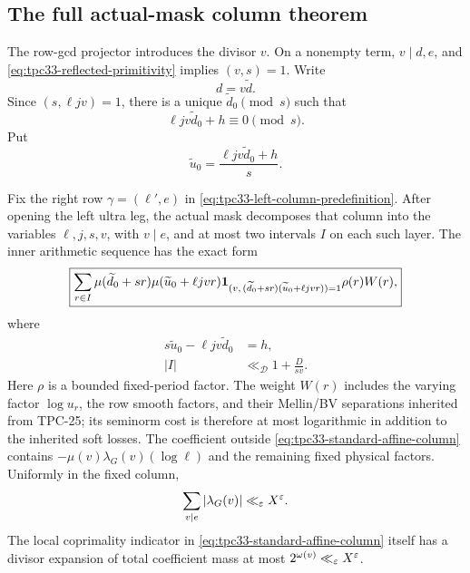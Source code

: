 \subsection{The full actual-mask column theorem}

The row-gcd projector introduces the divisor \(v\).  On a nonempty term,
\(v\mid d,e\), and \eqref{eq:tpc33-reflected-primitivity} implies
\((v,s)=1\).  Write
\begin{equation}
 d=v\widetilde d.
 \label{eq:tpc33-v-projected-row}
\end{equation}
Since \((s,\ell jv)=1\), there is a unique
\(\widetilde d_0\pmod s\) such that
\begin{equation}
 \ell jv\widetilde d_0+h\equiv0\pmod s.
 \label{eq:tpc33-projected-residue}
\end{equation}
Put
\begin{equation}
 \widetilde u_0=\frac{\ell jv\widetilde d_0+h}{s}.
 \label{eq:tpc33-projected-u0}
\end{equation}

\begin{theorem}
\label{thm:tpc33-actual-mask-column}
Fix the right row \(\gamma=(\ell',e)\) in
\eqref{eq:tpc33-left-column-predefinition}.  After opening the left ultra
leg, the actual mask decomposes that column into the variables
\(\ell,j,s,v\), with \(v\mid e\), and at most two intervals \(I\) on each
such layer.  The inner arithmetic sequence has the exact form
\begin{equation}
 \boxed{
 \sum_{r\in I}
 \mu(\widetilde d_0+sr)
 \mu(\widetilde u_0+\ell jv r)
 \mathbf 1_{(v,\, (\widetilde d_0+sr)
                 (\widetilde u_0+\ell jv r))=1}
 \rho(r)W(r),}
 \label{eq:tpc33-standard-affine-column}
\end{equation}
where
\begin{align}
 s\widetilde u_0-\ell jv\widetilde d_0&=h,
 \label{eq:tpc33-standard-affine-determinant}\\
 |I|&\ll_{\mathscr D}1+\frac{D}{sv}.
 \label{eq:tpc33-standard-affine-length}
\end{align}
Here \(\rho\) is a bounded fixed-period factor.  The weight \(W(r)\)
includes the varying factor \(\log u_r\), the row smooth factors, and their
Mellin/BV separations inherited from TPC-25; its seminorm cost is therefore
at most logarithmic in addition to the inherited soft losses.  The
coefficient outside \eqref{eq:tpc33-standard-affine-column} contains
\(-\mu(v)\lambda_G(v)(\log\ell)\) and the remaining fixed physical
factors.  Uniformly in the fixed column,
\begin{equation}
 \sum_{v\mid e}|\lambda_G(v)|\ll_\varepsilon X^\varepsilon.
 \label{eq:tpc33-column-mask-complexity}
\end{equation}
The local coprimality indicator in
\eqref{eq:tpc33-standard-affine-column} itself has a divisor expansion of
total coefficient mass at most \(2^{\omega(v)}\ll_\varepsilon X^\varepsilon\).
\end{theorem}

